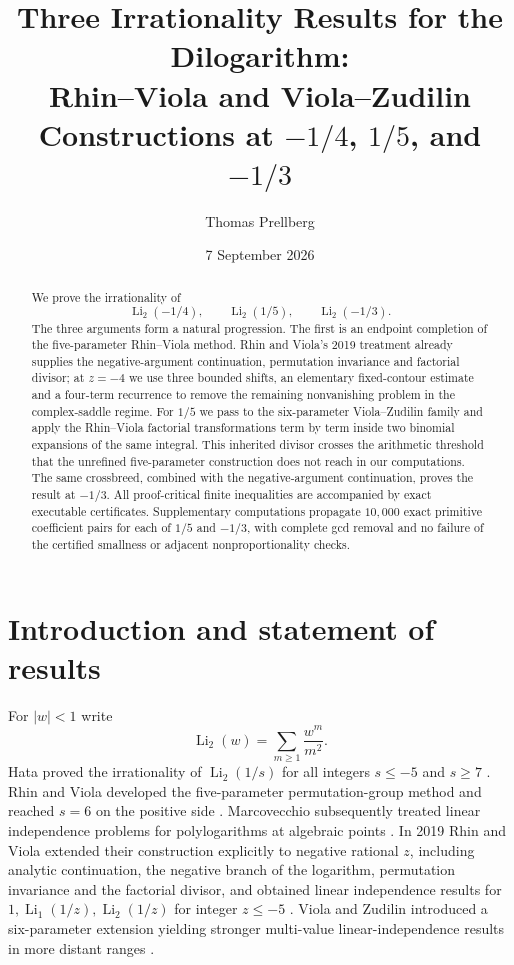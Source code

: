 \documentclass[11pt]{amsart}
\title[Three irrationality results for the dilogarithm]{Three Irrationality Results for the Dilogarithm:\\Rhin--Viola and Viola--Zudilin Constructions at $-1/4$, $1/5$, and $-1/3$}
\author{Thomas Prellberg}
\date{7 September 2026}
\newcommand{\Li}{\operatorname{Li}}
\theoremstyle{plain}
\theoremstyle{remark}\newtheorem{remark}[theorem]{Remark}
\numberwithin{equation}{section}
\begin{document}
\begin{abstract}
We prove the irrationality of
\[
 \Li_2(-1/4),\qquad \Li_2(1/5),\qquad \Li_2(-1/3).
\]
The three arguments form a natural progression.  The first is an endpoint completion of the five-parameter Rhin--Viola method.  Rhin and Viola's 2019 treatment already supplies the negative-argument continuation, permutation invariance and factorial divisor; at $z=-4$ we use three bounded shifts, an elementary fixed-contour estimate and a four-term recurrence to remove the remaining nonvanishing problem in the complex-saddle regime.  For $1/5$ we pass to the six-parameter Viola--Zudilin family and apply the Rhin--Viola factorial transformations term by term inside two binomial expansions of the same integral.  This inherited divisor crosses the arithmetic threshold that the unrefined five-parameter construction does not reach in our computations.  The same crossbreed, combined with the negative-argument continuation, proves the result at $-1/3$.  All proof-critical finite inequalities are accompanied by exact executable certificates.  Supplementary computations propagate $10{,}000$ exact primitive coefficient pairs for each of $1/5$ and $-1/3$, with complete gcd removal and no failure of the certified smallness or adjacent nonproportionality checks.
\end{abstract}
\maketitle

\section{Introduction and statement of results}\label{sec:intro}
For $|w|<1$ write
\[
 \Li_2(w)=\sum_{m\ge1}\frac{w^m}{m^2}.
\]
Hata proved the irrationality of $\Li_2(1/s)$ for all integers $s\le -5$ and $s\ge7$ \cite{Hata}.  Rhin and Viola developed the five-parameter permutation-group method and reached $s=6$ on the positive side \cite{RV05}.  Marcovecchio subsequently treated linear independence problems for polylogarithms at algebraic points \cite{Marc16}.  In 2019 Rhin and Viola extended their construction explicitly to negative rational $z$, including analytic continuation, the negative branch of the logarithm, permutation invariance and the factorial divisor, and obtained linear independence results for $1,\Li_1(1/z),\Li_2(1/z)$ for integer $z\le-5$ \cite{RV19}.  Viola and Zudilin introduced a six-parameter extension yielding stronger multi-value linear-independence results in more distant ranges \cite{VZ18}.
\end{document}
